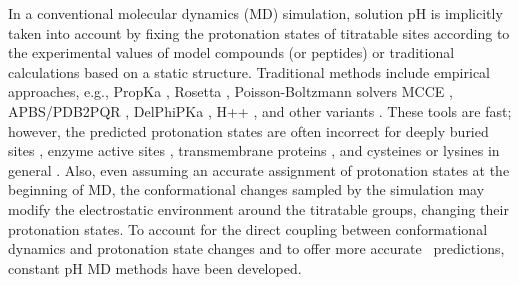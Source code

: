 In a conventional molecular dynamics (MD) simulation,
solution pH is implicitly taken into account by
fixing the protonation states of titratable sites according to the experimental {\pka} values of
model compounds (or peptides) or 
traditional {\pka} calculations based on a static structure. 
Traditional {\pka} methods include empirical
approaches, e.g.,
PropKa \cite{Olsson_Jensen_2011_J.Chem.TheoryComput.},
Rosetta \cite{Kilambi_Gray_2012_Biophys.J.},
Poisson-Boltzmann solvers
MCCE \cite{Song_Gunner_2009_J.Comput.Chem.},
APBS/PDB2PQR \cite{Unni_Baker_2011_J.Comput.Chem.}, 
DelPhiPKa \cite{Wang_Alexov_2016_Bioinformatics},  
H++ \cite{Anandakrishnan_Onufriev_2012_NucleicAcidsRes.},
and other variants \cite{WarwickerJim_WarwickerJim_2011_Proteins}.
These tools are fast; however, 
the predicted protonation states are often incorrect
for deeply buried sites
\cite{Alexov_Word_2011_Proteins},
enzyme active sites \cite{Huang_Shen_2018_J.Phys.Chem.Lett.},
transmembrane proteins \cite{Huang_Shen_2016_Nat.Commun.},
and cysteines or lysines in general \cite{Liu_Shen_2019_J.Am.Chem.Soc.,Harris_Shen_2020_J.Chem.TheoryComput.,Liu_Shen_2021_J.Med.Chem.a}.
Also, even assuming an accurate assignment of protonation states at the beginning of MD, the conformational changes sampled
by the simulation may modify the electrostatic environment around the titratable groups, changing their protonation states. 
To account for 
the direct coupling between conformational dynamics and protonation state changes and to offer more accurate \pka\ predictions, constant pH MD methods have been developed.


